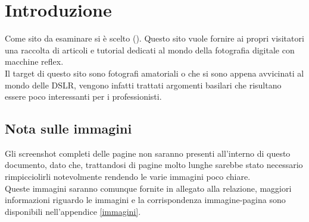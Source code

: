 \section{Introduzione}
Come sito da esaminare si è scelto \siteName (\siteUrl). Questo sito vuole fornire ai propri visitatori una raccolta di articoli e tutorial dedicati al mondo della fotografia digitale con macchine reflex. \\
Il target di questo sito sono fotografi amatoriali o che si sono appena avvicinati al mondo delle DSLR, vengono infatti trattati argomenti basilari che risultano essere poco interessanti per i professionisti.

\subsection{Nota sulle immagini}
Gli screenshot completi delle pagine non saranno presenti all'interno di questo documento, dato che, trattandosi di pagine molto lunghe sarebbe stato necessario rimpicciolirli notevolmente rendendo le varie immagini poco chiare.\\
Queste immagini saranno comunque fornite in allegato alla relazione, maggiori informazioni riguardo le immagini e la corrispondenza immagine-pagina sono disponibili nell'appendice \ref{immagini}.
